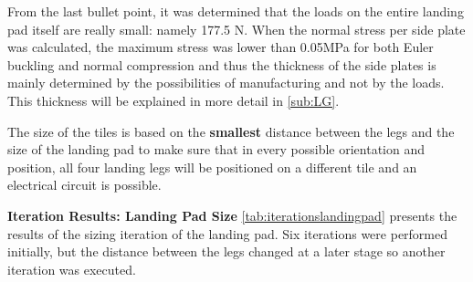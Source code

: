 From the last bullet point, it was determined that the loads on the entire landing pad itself are really small: namely 177.5 N. When the normal stress per side plate was calculated, the maximum stress was lower than 0.05MPa for both Euler buckling and normal compression and thus the thickness of the side plates is mainly determined by the possibilities of manufacturing and not by the loads. This thickness will be explained in more detail in \autoref{sub:LG}.

The size of the tiles is based on the \textbf{smallest} distance between the legs and the size of the landing pad to make sure that in every possible orientation and position, all four landing legs will be positioned on a different tile and an electrical circuit is possible.

\textbf{Iteration Results: Landing Pad Size}\newline
\autoref{tab:iterationslandingpad} presents the results of the sizing iteration of the landing pad. Six iterations were performed initially, but the distance between the legs changed at a later stage so another iteration was executed.

